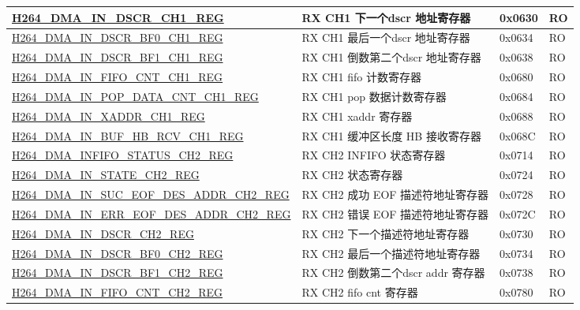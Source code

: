\begin{longtable}{ | p{7.5cm} | p{5.7cm} | p{1.2cm} | p{1.5cm} | }
    \hyperref[regdesc:H264DMAINDSCRCH1REG]{H264\_DMA\_IN\_DSCR\_CH1\_REG} & RX CH1 下一个dscr 地址寄存器 & 0x0630 & RO \\ \hline
    \hyperref[regdesc:H264DMAINDSCRBF0CH1REG]{H264\_DMA\_IN\_DSCR\_BF0\_CH1\_REG} & RX CH1 最后一个dscr 地址寄存器 & 0x0634 & RO \\ \hline
    \hyperref[regdesc:H264DMAINDSCRBF1CH1REG]{H264\_DMA\_IN\_DSCR\_BF1\_CH1\_REG} & RX CH1 倒数第二个dscr 地址寄存器 & 0x0638 & RO \\ \hline
    \hyperref[regdesc:H264DMAINFIFOCNTCH1REG]{H264\_DMA\_IN\_FIFO\_CNT\_CH1\_REG} & RX CH1 fifo 计数寄存器 & 0x0680 & RO \\ \hline
    \hyperref[regdesc:H264DMAINPOPDATACNTCH1REG]{H264\_DMA\_IN\_POP\_DATA\_CNT\_CH1\_REG} & RX CH1 pop 数据计数寄存器 & 0x0684 & RO \\ \hline
    \hyperref[regdesc:H264DMAINXADDRCH1REG]{H264\_DMA\_IN\_XADDR\_CH1\_REG} & RX CH1 xaddr 寄存器 & 0x0688 & RO \\ \hline
    \hyperref[regdesc:H264DMAINBUFHBRCVCH1REG]{H264\_DMA\_IN\_BUF\_HB\_RCV\_CH1\_REG} & RX CH1  缓冲区长度 HB 接收寄存器 & 0x068C & RO \\ \hline
    \hyperref[regdesc:H264DMAINFIFOSTATUSCH2REG]{H264\_DMA\_INFIFO\_STATUS\_CH2\_REG} & RX CH2 INFIFO 状态寄存器 & 0x0714 & RO \\ \hline
    \hyperref[regdesc:H264DMAINSTATECH2REG]{H264\_DMA\_IN\_STATE\_CH2\_REG} & RX CH2 状态寄存器 & 0x0724 & RO \\ \hline
    \hyperref[regdesc:H264DMAINSUCEOFDESADDRCH2REG]{H264\_DMA\_IN\_SUC\_EOF\_DES\_ADDR\_CH2\_REG} & RX CH2 成功 EOF 描述符地址寄存器 & 0x0728 & RO \\ \hline
    \hyperref[regdesc:H264DMAINERREOFDESADDRCH2REG]{H264\_DMA\_IN\_ERR\_EOF\_DES\_ADDR\_CH2\_REG} & RX CH2 错误 EOF 描述符地址寄存器 & 0x072C & RO \\ \hline
    \hyperref[regdesc:H264DMAINDSCRCH2REG]{H264\_DMA\_IN\_DSCR\_CH2\_REG} & RX CH2 下一个描述符地址寄存器 & 0x0730 & RO \\ \hline
    \hyperref[regdesc:H264DMAINDSCRBF0CH2REG]{H264\_DMA\_IN\_DSCR\_BF0\_CH2\_REG} & RX CH2 最后一个描述符地址寄存器 & 0x0734 & RO \\ \hline
    \hyperref[regdesc:H264DMAINDSCRBF1CH2REG]{H264\_DMA\_IN\_DSCR\_BF1\_CH2\_REG} & RX CH2 倒数第二个dscr addr 寄存器 & 0x0738 & RO \\ \hline
    \hyperref[regdesc:H264DMAINFIFOCNTCH2REG]{H264\_DMA\_IN\_FIFO\_CNT\_CH2\_REG} & RX CH2 fifo cnt 寄存器 & 0x0780 & RO \\ \hline

\end{longtable}
